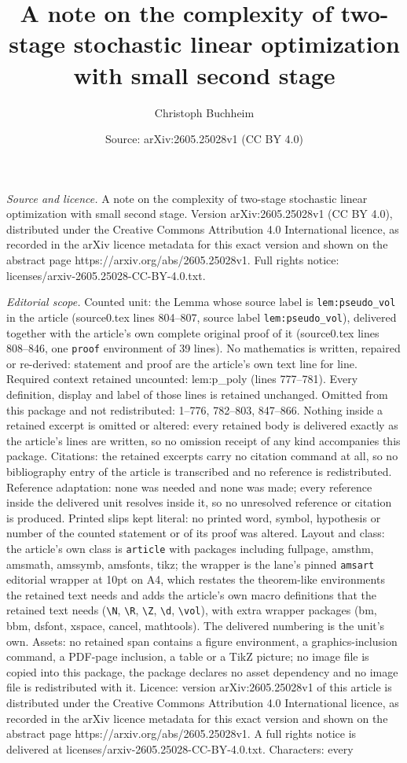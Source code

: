 \documentclass[10pt,a4paper]{amsart}
\title[A note on the complexity of two-stage stochastic linear opti]{A note on the complexity of two-stage stochastic linear optimization with small second stage}
\author{Christoph Buchheim}
\date{Source: arXiv:2605.25028v1 (CC BY 4.0)}
\begin{document}
\maketitle

\noindent\emph{Source and licence.} A note on the complexity of two-stage stochastic linear optimization with small second stage. Version arXiv:2605.25028v1 (CC BY 4.0), distributed under the Creative Commons Attribution 4.0 International licence, as recorded in the arXiv licence metadata for this exact version and shown on the abstract page https://arxiv.org/abs/2605.25028v1. Full rights notice: licenses/arxiv-2605.25028-CC-BY-4.0.txt.\par\smallskip

\noindent\textit{Editorial scope.} Counted unit: the Lemma whose source label is \texttt{lem:pseudo\_vol} in the article (source0.tex lines 804--807, source label \texttt{lem:pseudo\_vol}), delivered together with the article's own complete original proof of it (source0.tex lines 808--846, one \texttt{proof} environment of 39 lines). No mathematics is written, repaired or re-derived: statement and proof are the article's own text line for line. Required context retained uncounted: lem:p\_poly (lines 777--781). Every definition, display and label of those lines is retained unchanged. Omitted from this package and not redistributed: 1--776, 782--803, 847--866. Nothing inside a retained excerpt is omitted or altered: every retained body is delivered exactly as the article's lines are written, so no omission receipt of any kind accompanies this package. Citations: the retained excerpts carry no citation command at all, so no bibliography entry of the article is transcribed and no reference is redistributed. Reference adaptation: none was needed and none was made; every reference inside the delivered unit resolves inside it, so no unresolved reference or citation is produced. Printed slips kept literal: no printed word, symbol, hypothesis or number of the counted statement or of its proof was altered. Layout and class: the article's own class is \texttt{article} with packages including fullpage, amsthm, amsmath, amssymb, amsfonts, tikz; the wrapper is the lane's pinned \texttt{amsart} editorial wrapper at 10pt on A4, which restates the theorem-like environments the retained text needs and adds the article's own macro definitions that the retained text needs (\texttt{\textbackslash N}, \texttt{\textbackslash R}, \texttt{\textbackslash Z}, \texttt{\textbackslash d}, \texttt{\textbackslash vol}), with extra wrapper packages (bm, bbm, dsfont, xspace, cancel, mathtools). The delivered numbering is the unit's own. Assets: no retained span contains a figure environment, a graphics-inclusion command, a PDF-page inclusion, a table or a TikZ picture; no image file is copied into this package, the package declares no asset dependency and no image file is redistributed with it. Licence: version arXiv:2605.25028v1 of this article is distributed under the Creative Commons Attribution 4.0 International licence, as recorded in the arXiv licence metadata for this exact version and shown on the abstract page https://arxiv.org/abs/2605.25028v1. A full rights notice is delivered at licenses/arxiv-2605.25028-CC-BY-4.0.txt. Characters: every 
\end{document}
